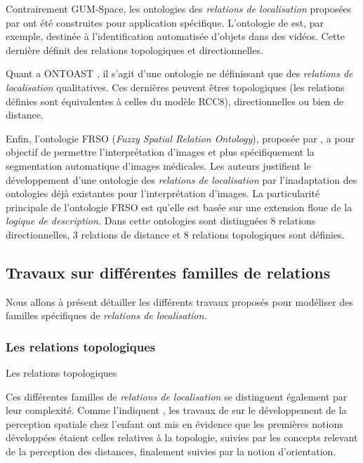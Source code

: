 Contrairement GUM-Space, les ontologies des \emph{relations de
  localisation} proposées par
\textcite{Dasiopoulou2005,Miron2007,Hudelot2008a} ont été construites
pour application spécifique. L'ontologie de \textcite{Dasiopoulou2005}
est, par exemple, destinée à l'identification automatisée d'objets
dans des vidéos. Cette dernière définit des relations topologiques et
directionnelles. 

Quant a ONTOAST \autocite{Miron2007}, il s'agit d'une ontologie ne
définissant que des \emph{relations de localisation} qualitatives. Ces
dernières peuvent êtres topologiques (les relations définies sont
équivalentes à celles du modèle RCC8), directionnelles ou bien de
distance.

Enfin, l'ontologie FRSO (\emph{Fuzzy Spatial Relation Ontology}),
proposée par \textcite{Hudelot2008a}, a pour objectif de permettre
l’interprétation d'images et plus spécifiquement la segmentation
automatique d'images médicales. Les auteurs justifient le
développement d'une ontologie des \emph{relations de localisation} par
l'inadaptation des ontologies déjà existantes pour l'interprétation
d'images.
%
La particularité principale de l'ontologie FRSO est qu'elle est basée
sur une extension floue de la \emph{logique de description.}
%
Dans cette ontologies sont distinguées 8 relations directionnelles, 3
relations de distance et 8 relations topologiques sont définies.

\subsection{Travaux sur différentes familles de relations}

Nous allons à présent détailler les différents travaux proposés pour
modéliser des familles spécifiques de \emph{relations de
  localisation.}

\subsubsection{Les relations topologiques}

Les relations topologiques 

Ces différentes familles de \emph{relations de localisation} se
distinguent également par leur complexité. Comme l'indiquent
\textcite{Aurnague1997}, les travaux de \textcite{Piaget1948} sur le
développement de la perception spatiale chez l'enfant ont mis en
évidence que les premières notions développées étaient celles
relatives à la topologie, suivies par les concepts relevant de la
perception des distances, finalement suivies par la notion
d'orientation.

